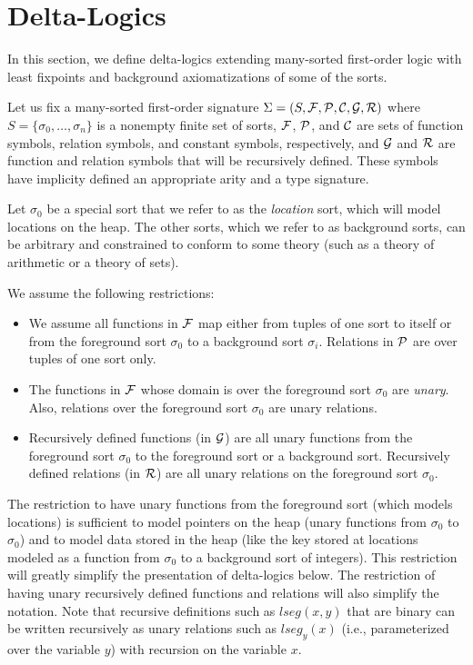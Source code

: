 \section{Delta-Logics}
\label{sec:delta-logics}

In this section, we define delta-logics extending many-sorted first-order logic with least fixpoints
and background axiomatizations of some of the sorts.

Let us fix a many-sorted first-order signature $\Sigma = (S, {\cal F}, {\cal P}, {\cal C}, {\cal G}, {\cal R})$ where 
$S=\{\sigma_0, \ldots, \sigma_n\}$ is a nonempty finite set of sorts, 
${\cal F}$, ${\cal P}$, and ${\cal C}$ are sets of function symbols, relation symbols,
and constant symbols, respectively, and
${\cal G}$ and ${\cal R}$ are function and relation symbols that will be recursively defined. 
These symbols have implicity defined an appropriate arity and a type signature.


Let $\sigma_0$ be a special sort that we refer to as the \emph{location} sort, which
will model locations on the heap. The other sorts, which we refer to as background sorts, can be arbitrary and
constrained to conform to some theory (such as a theory of arithmetic or a theory of sets).

We assume the following restrictions:
\begin{itemize}
	\item We assume all functions in ${\cal F}$ map either from tuples of one sort to itself or from the foreground
	 sort $\sigma_0$ to a background sort $\sigma_i$. Relations in ${\cal P}$ are over tuples of one sort only.
	\item The functions in ${\cal F}$ whose domain is over the foreground sort $\sigma_0$ are \emph{unary}.
	      Also, relations over the foreground sort $\sigma_0$ are unary relations.
	\item Recursively defined functions (in ${\cal G}$) are all unary functions from the foreground sort $\sigma_0$ 
	         to the foreground sort or a background sort. Recursively defined relations (in ${\cal R}$) are all unary relations on the foreground sort $\sigma_0$.
\end{itemize}

The restriction to have unary functions from the foreground sort (which models locations) is sufficient
to model pointers on the heap (unary functions from $\sigma_0$ to $\sigma_0$) 
and to model data stored in the heap (like the key stored at locations modeled as a function from $\sigma_0$ to a
background sort of integers).
This restriction will greatly simplify the presentation of delta-logics below.
The restriction of having unary recursively defined functions and relations will also simplify the notation.
Note that recursive definitions such as $\textit{lseg}(x,y)$ that are binary can be written recursively
as unary relations such as $\textit{lseg}_y(x)$ (i.e., parameterized over the variable $y$) with recursion
on the variable $x$. 

